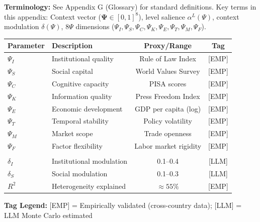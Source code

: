 
\begin{tcolorbox}[colback=gray!5!white, colframe=gray!50!black]
\textbf{Terminology:} See Appendix G (Glossary) for standard definitions.
Key terms in this appendix: Context vector ($\boldsymbol{\Psi} \in [0,1]^8$),
level salience $\alpha^L(\Psi)$, context modulation $\delta(\Psi)$,
8$\Psi$ dimensions ($\Psi_I, \Psi_S, \Psi_C, \Psi_K, \Psi_E, \Psi_T, \Psi_M, \Psi_F$).
\end{tcolorbox}

\begin{tcolorbox}[colback=blue!5!white, colframe=blue!75!black,
    title=\textbf{Epistemic Status: Key Parameters}]

\renewcommand{\arraystretch}{1.3}
\begin{tabular}{@{}llcc@{}}
\toprule
\textbf{Parameter} & \textbf{Description} & \textbf{Proxy/Range} & \textbf{Tag} \\
\midrule
$\Psi_I$ & Institutional quality & Rule of Law Index & [EMP] \\
$\Psi_S$ & Social capital & World Values Survey & [EMP] \\
$\Psi_C$ & Cognitive capacity & PISA scores & [EMP] \\
$\Psi_K$ & Information quality & Press Freedom Index & [EMP] \\
$\Psi_E$ & Economic development & GDP per capita (log) & [EMP] \\
$\Psi_T$ & Temporal stability & Policy volatility & [EMP] \\
$\Psi_M$ & Market scope & Trade openness & [EMP] \\
$\Psi_F$ & Factor flexibility & Labor market rigidity & [EMP] \\
\addlinespace
\multicolumn{4}{@{}l}{\textit{Modulation effects:}} \\
$\delta_I$ & Institutional modulation & 0.1--0.4 & [LLM] \\
$\delta_S$ & Social modulation & 0.1--0.3 & [LLM] \\
$R^2$ & Heterogeneity explained & $\approx 55\%$ & [EMP] \\
\bottomrule
\end{tabular}

\vspace{0.5em}
\textbf{Tag Legend:} [EMP] = Empirically validated (cross-country data);
[LLM] = LLM Monte Carlo estimated

\end{tcolorbox}

